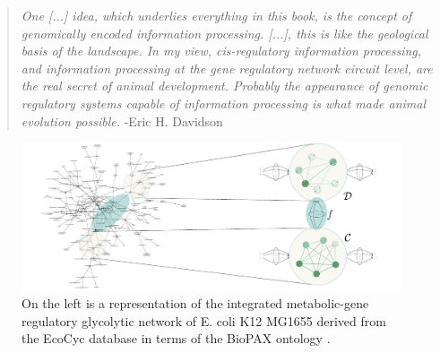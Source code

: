 \begin{frame}
\begin{quotation}
{\it One [...] idea, which underlies everything in this book, is the concept
of genomically encoded information processing. [...],
this is like the geological basis of the landscape. In my view, cis-regulatory information processing, and information processing at the gene regulatory network circuit level, are the real secret of animal development. Probably the appearance of genomic regulatory systems capable of information processing is what made animal evolution possible.} -Eric H. Davidson \cite{Davidson2006a}
\end{quotation}
\end{frame}

\begin{frame}
\begin{figure}
\noindent\includegraphics[width=1.0\framewidth]{fig/biograph.pdf}
\caption{%
On the left is a representation of the integrated metabolic-gene regulatory glycolytic network of E. coli K12 MG1655 derived from the EcoCyc database \cite{Keseler2011} in terms of the BioPAX ontology \cite{Demir2010}. 
}
\label{fig:biograph}
\end{figure}
\end{frame}